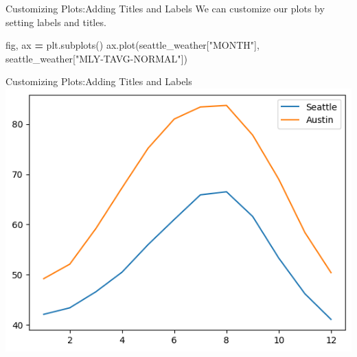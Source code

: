 \documentclass[
  ignorenonframetext,
]{beamer}
\newenvironment{Shaded}{\begin{snugshade}}{\end{snugshade}}
\newcommand{\NormalTok}[1]{#1}
\newcommand{\OperatorTok}[1]{\textcolor[rgb]{0.81,0.36,0.00}{\textbf{#1}}}
\newcommand{\StringTok}[1]{\textcolor[rgb]{0.31,0.60,0.02}{#1}}
\begin{document}
\begin{frame}[fragile]{Customizing Plots:Adding Titles and Labels}
\label{customizing-plotsadding-titles-and-labels}
We can customize our plots by setting labels and titles.


\begin{Shaded}
\begin{Highlighting}[]
\NormalTok{fig, ax }\OperatorTok{=}\NormalTok{ plt.subplots()}
\NormalTok{ax.plot(seattle\_weather[}\StringTok{"MONTH"}\NormalTok{], seattle\_weather[}\StringTok{"MLY{-}TAVG{-}NORMAL"}\NormalTok{])}
\end{Highlighting}
\end{Shaded}
\end{frame}

\begin{frame}{Customizing Plots:Adding Titles and Labels}
\label{customizing-plotsadding-titles-and-labels-1}
\includegraphics{../images/im227.png}
\end{frame}
\end{document}
